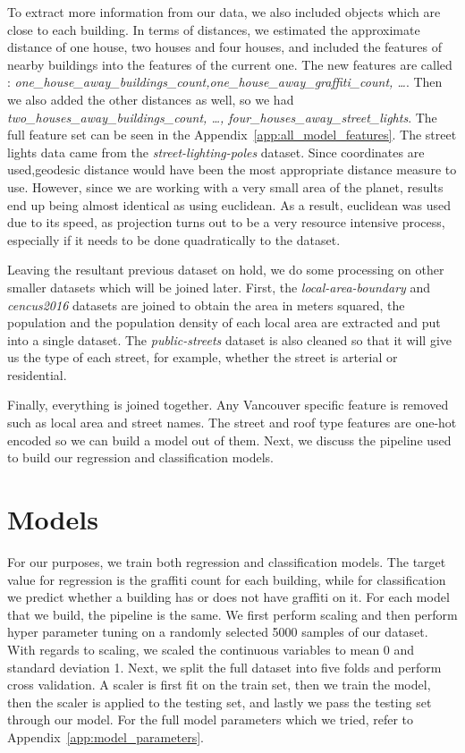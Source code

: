 To extract more information from our data, we also included objects which are close to each building. In terms of distances, we estimated the approximate distance of one house, two houses and four houses, and included the features of nearby buildings into the features of the current one. The new features are called : \textit{one\_house\_away\_buildings\_count,one\_house\_away\_graffiti\_count, \ldots}. Then we also added the other distances as well, so we had \textit{two\_houses\_away\_buildings\_count, \ldots, four\_houses\_away\_street\_lights}. The full feature set can be seen in the Appendix~\ref{app:all_model_features}. The street lights data came from the \textit{street-lighting-poles} dataset. Since coordinates are used,geodesic distance would have been the most appropriate distance measure to use. However, since we are working with a very small area of the planet, results end up being almost identical as using euclidean. As a result, euclidean was used due to its speed, as projection turns out to be a very resource intensive process, especially if it needs to be done quadratically to the dataset.

Leaving the resultant previous dataset on hold, we do some processing on other smaller datasets which will be joined later. First, the \textit{local-area-boundary} and \textit{cencus2016} datasets are joined to obtain the area in meters squared, the population and the population density of each local area are extracted and put into a single dataset. The \textit{public-streets} dataset is also cleaned so that it will give us the type of each street, for example, whether the street is arterial or residential.

Finally, everything is joined together. Any Vancouver specific feature is removed such as local area and street names. The street and roof type features are one-hot encoded so we can build a model out of them. Next, we discuss the pipeline used to build our regression and classification models.

\section{Models}

For our purposes, we train both regression and classification models. The target value for regression is the graffiti count for each building, while for classification we predict whether a building has or does not have graffiti on it. For each model that we build, the pipeline is the same. We first perform scaling and then perform hyper parameter tuning on a randomly selected 5000 samples of our dataset. With regards to scaling, we scaled the continuous variables to mean 0 and standard deviation 1. Next, we split the full dataset into five folds and perform cross validation. A scaler is first fit on the train set, then we train the model, then the scaler is applied to the testing set, and lastly we pass the testing set through our model. For the full model parameters which we tried, refer to Appendix~\ref{app:model_parameters}.

